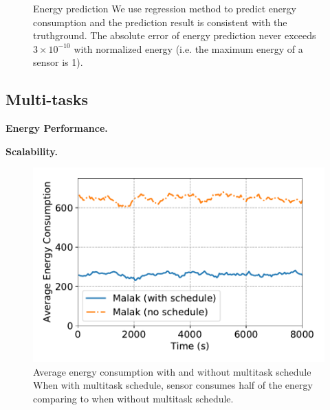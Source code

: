\begin{figure}[htbp]
	\centering
	\hspace{0.1cm}
	\vspace{-0.1in}
	\caption{Energy prediction
		\textnormal{
			We use regression method to predict energy consumption and the
			prediction result is consistent with the truthground.  The absolute
			error of energy prediction never exceeds $3\times10^{-10}$ with normalized energy
			(i.e. the maximum energy of a sensor is 1).
		}
	}
	\label{fig:energy_pred}
\end{figure}

\subsection{Multi-tasks}
\textbf{Energy Performance.}

\textbf{Scalability.}
\begin{figure}[htbp]
	\centering
	\includegraphics[width=.85\columnwidth]{Figure/multitask_energy}
	\vspace{-0.1in}
	\caption{Average energy consumption with and without multitask schedule
		\textnormal{When with multitask schedule, sensor consumes half of the energy
			comparing to when without multitask schedule.}}
	\label{fig:multitask_energy}
\end{figure}
